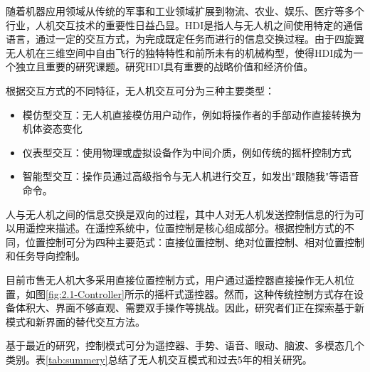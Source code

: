 随着机器应用领域从传统的军事和工业领域扩展到物流、农业、娱乐、医疗等多个行业，人机交互技术的重要性日益凸显。HDI是指人与无人机之间使用特定的通信语言，通过一定的交互方式，为完成既定任务而进行的信息交换过程。由于四旋翼无人机在三维空间中自由飞行的独特特性和前所未有的机械构型，使得HDI成为一个独立且重要的研究课题\cites{tezza2019state}。研究HDI具有重要的战略价值和经济价值\cites{kyrkou2019drones,CUI2022135}。

根据交互方式的不同特征，无人机交互可分为三种主要类型\cites{tezza2019state}：

\begin{itemize}
    \item 模仿型交互：无人机直接模仿用户动作，例如将操作者的手部动作直接转换为机体姿态变化
    \item 仪表型交互：使用物理或虚拟设备作为中间介质，例如传统的摇杆控制方式
    \item 智能型交互：操作员通过高级指令与无人机进行交互，如发出"跟随我"等语音命令。
\end{itemize}

人与无人机之间的信息交换是双向的过程，其中人对无人机发送控制信息的行为可以用遥控来描述。在遥控系统中，位置控制是核心组成部分。根据控制方式的不同，位置控制可分为四种主要范式\cites{funk2018human}：直接位置控制、绝对位置控制、相对位置控制和任务导向控制。

目前市售无人机大多采用直接位置控制方式，用户通过遥控器直接操作无人机位置，如图\ref{fig:2.1-Controller}所示的摇杆式遥控器。然而，这种传统控制方式存在设备体积大、界面不够直观、需要双手操作等挑战。因此，研究者们正在探索基于新模式和新界面的替代交互方法。

基于最近的研究，控制模式可分为遥控器、手势、语音、眼动、脑波、多模态几个类别。表\ref{tab:summery}总结了无人机交互模式和过去5年的相关研究。

